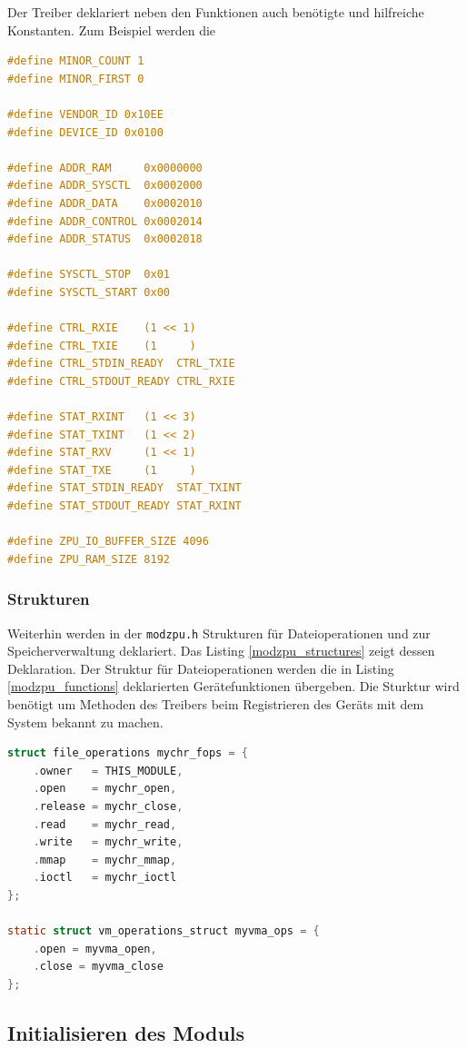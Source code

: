 \documentclass[11pt]{scrartcl}
\begin{document}
Der Treiber deklariert neben den Funktionen auch benötigte und hilfreiche Konstanten. Zum Beispiel werden die 
\begin{lstlisting}[language=C, firstnumber=13,label=modzpu_constants, caption=Verwendete Konstanten im Treibermodul]
#define MINOR_COUNT 1
#define MINOR_FIRST 0

#define VENDOR_ID 0x10EE
#define DEVICE_ID 0x0100

#define ADDR_RAM     0x0000000
#define ADDR_SYSCTL  0x0002000
#define ADDR_DATA    0x0002010
#define ADDR_CONTROL 0x0002014
#define ADDR_STATUS  0x0002018

#define SYSCTL_STOP  0x01
#define SYSCTL_START 0x00

#define CTRL_RXIE    (1 << 1)
#define CTRL_TXIE    (1     )
#define CTRL_STDIN_READY  CTRL_TXIE
#define CTRL_STDOUT_READY CTRL_RXIE

#define STAT_RXINT   (1 << 3)
#define STAT_TXINT   (1 << 2)
#define STAT_RXV     (1 << 1)
#define STAT_TXE     (1     )
#define STAT_STDIN_READY  STAT_TXINT
#define STAT_STDOUT_READY STAT_RXINT

#define ZPU_IO_BUFFER_SIZE 4096
#define ZPU_RAM_SIZE 8192
\end{lstlisting}


\subsubsection{Strukturen}
Weiterhin werden in der \texttt{modzpu.h} Strukturen für Dateioperationen und zur Speicherverwaltung deklariert. Das Listing \ref{modzpu_structures} zeigt dessen Deklaration. Der Struktur für Dateioperationen werden die in Listing \ref{modzpu_functions} deklarierten Gerätefunktionen übergeben. Die Sturktur wird benötigt um Methoden des Treibers beim Registrieren des Geräts mit dem System bekannt zu machen. 

\begin{lstlisting}[language=C, firstnumber=69, label=modzpu_structures,caption=modzpu Strukturen]
struct file_operations mychr_fops = {
	.owner   = THIS_MODULE,
	.open    = mychr_open,
	.release = mychr_close,
	.read    = mychr_read,
	.write   = mychr_write,
	.mmap    = mychr_mmap,
	.ioctl   = mychr_ioctl
};

static struct vm_operations_struct myvma_ops = {
	.open = myvma_open,
	.close = myvma_close
};

\end{lstlisting}


\subsection{Initialisieren des Moduls}
\end{document}
